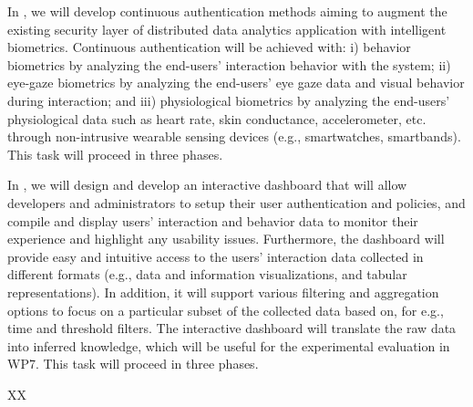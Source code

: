 \begin{Workpackage}{\thewpno}
\begin{Task}

\TaskResults{%
}
\TaskHeader{}

In \theTask, we will develop continuous authentication methods aiming to augment the existing security layer of distributed data analytics application with intelligent biometrics. Continuous authentication will be achieved with: i) behavior biometrics by analyzing the end-users' interaction behavior with the system; ii) eye-gaze biometrics by analyzing the end-users' eye gaze data and visual behavior during interaction; and iii) physiological biometrics by analyzing the end-users' physiological data such as heart rate, skin conductance, accelerometer, etc. through non-intrusive wearable sensing devices (e.g., smartwatches, smartbands).
This task will proceed in three phases. 
\end{Task}


\begin{Task}

\TaskResults{%
}
\TaskHeader{}

In \theTask, we will design and develop an interactive dashboard that will allow developers and administrators to setup their user authentication and policies, and compile and display users’ interaction and behavior data to monitor their experience and highlight any usability issues. Furthermore, the dashboard will provide easy and intuitive access to the users’ interaction data collected in different formats (e.g., data and information visualizations, and tabular representations). In addition, it will support various filtering and aggregation options to focus on a particular subset of the collected data based on, for e.g., time and threshold filters. The interactive dashboard will translate the raw data into inferred knowledge, which will be useful for the experimental evaluation in WP7. This task will proceed in three phases. 
\end{Task}



\begin{WPDeliverables}
  \begin{compactitem}
    \item XX
\end{compactitem}
\end{WPDeliverables}
\end{Workpackage}
